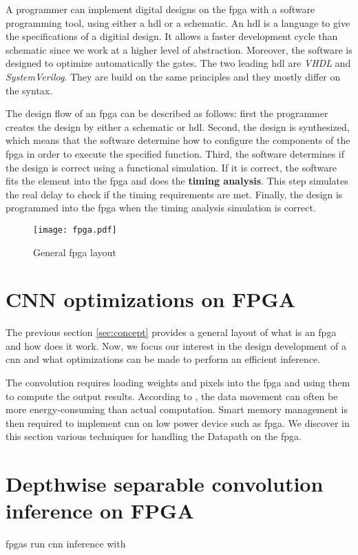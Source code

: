 A programmer can implement digital designs on the \acrshort{fpga} with a software programming tool, using either a \acrfull{hdl} or a schematic. An \acrshort{hdl} is a language to give the specifications of a digitial design. It allows a faster development cycle than schematic since we work at a higher level of abstraction. Moreover, the software is designed to optimize automatically the gates. The two leading \acrshort{hdl} are \textit{VHDL} and \textit{SystemVerilog}. They are build on the same principles and they mostly differ on the syntax.

The design flow of an \acrshort{fpga} can be described as follows: first the programmer creates the design by either a schematic or \acrshort{hdl}. Second, the design is synthesized, which means that the software determine how to configure the components of the \acrshort{fpga} in order to execute the specified function. Third, the software determines if the design is correct using a functional simulation. If it is correct, the software fits the element into the \acrshort{fpga} and does the \textbf{timing analysis}. This step simulates the real delay to check if the timing requirements are met. Finally, the design is programmed into the \acrshort{fpga} when the timing analysis simulation is correct.

\begin{figure}
    \texttt{[image: fpga.pdf]}
    \caption{General \acrshort{fpga} layout \cite{harris_digital_2015}}
    \label{fig:fpga}
\end{figure}
%
%
\section{CNN optimizations on FPGA} \label{sec:opti_dataflow}
%
%
The previous section \ref{sec:concept} provides a general layout of what is an \acrshort{fpga} and how does it work. Now, we focus our interest in the design development of a \acrshort{cnn} and what optimizations can be made to perform an efficient inference.

The convolution requires loading weights and pixels into the \acrshort{fpga} and using them to compute the output results. According to \textcite{chen_eyeriss_2017}, the data movement can often be more energy-consuming than actual computation. Smart memory management is then required to implement \acrshort{cnn} on low power device such as \acrshort{fpga}. We discover in this section various techniques for handling the Datapath on the \acrshort{fpga}.
%

%
%
\section{Depthwise separable convolution inference on FPGA} \label{sec:inf_fpga}
%
%
\acrshort{fpga}s run \acrshort{cnn} inference with  \cite{vestias_fast_2019}


